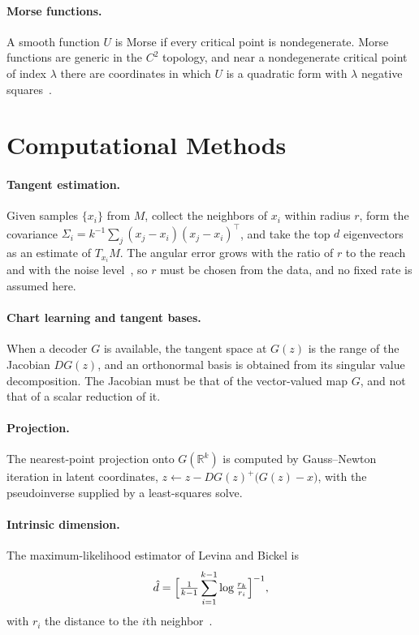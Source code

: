 \documentclass[11pt,a4paper]{article}
\theoremstyle{definition}
\theoremstyle{remark}
\newcommand{\R}{\mathbb{R}}
\begin{document}
\paragraph{Morse functions.} A smooth function $U$ is Morse if every critical
point is nondegenerate. Morse functions are generic in the $C^2$ topology, and
near a nondegenerate critical point of index $\lambda$ there are coordinates in
which $U$ is a quadratic form with $\lambda$ negative squares~\cite{milnor1963morse}.

\section{Computational Methods}\label{app:methods}

\paragraph{Tangent estimation.} Given samples $\{x_i\}$ from $M$, collect the
neighbors of $x_i$ within radius $r$, form the covariance
$\Sigma_i=k^{-1}\sum_{j}(x_j-x_i)(x_j-x_i)^\top$, and take the top $d$ eigenvectors
as an estimate of $T_{x_i}M$. The angular error grows with the ratio of $r$ to
the reach and with the noise level~\cite{singer2012vector}, so $r$ must be
chosen from the data, and no fixed rate is assumed here.

\paragraph{Chart learning and tangent bases.} When a decoder $G$ is available,
the tangent space at $G(z)$ is the range of the Jacobian $DG(z)$, and an
orthonormal basis is obtained from its singular value decomposition. The
Jacobian must be that of the vector-valued map $G$, and not that of a scalar
reduction of it.

\paragraph{Projection.} The nearest-point projection onto $G(\R^k)$ is computed
by Gauss--Newton iteration in latent coordinates,
$z\leftarrow z-DG(z)^{+}\bigl(G(z)-x\bigr)$, with the pseudoinverse supplied
by a least-squares solve.

\paragraph{Intrinsic dimension.} The maximum-likelihood estimator of Levina and
Bickel is
\[
\hat d=\Bigl[\tfrac1{k-1}\sum_{i=1}^{k-1}\log\tfrac{r_k}{r_i}\Bigr]^{-1},
\]
with $r_i$ the distance to the $i$th neighbor~\cite{levina2005maximum}.
\end{document}
